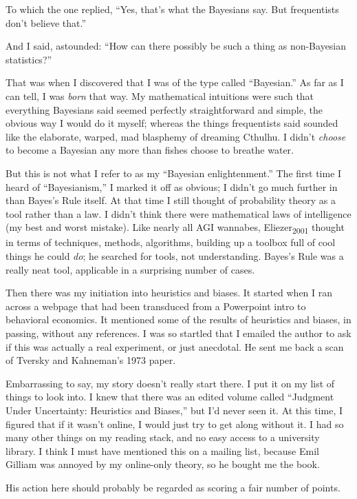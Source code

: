 {
 To which the one replied, ``Yes,
that's what the Bayesians say. But frequentists
don't believe that.''}

{
 And I said, astounded: ``How can there possibly
be such a thing as non-Bayesian statistics?''}

{
 That was when I discovered that I was of the type called
``Bayesian.'' As far as I can tell,
I was \textit{born} that way. My mathematical intuitions were such that
everything Bayesians said seemed perfectly straightforward and simple,
the obvious way I would do it myself; whereas the things frequentists
said sounded like the elaborate, warped, mad blasphemy of dreaming
Cthulhu. I didn't \textit{choose} to become a Bayesian
any more than fishes choose to breathe water.}

{
 But this is not what I refer to as my ``Bayesian
enlightenment.'' The first time I heard of
``Bayesianism,'' I marked it off as
obvious; I didn't go much further in than
Bayes's Rule itself. At that time I still thought of
probability theory as a tool rather than a law. I
didn't think there were mathematical laws of
intelligence (my best and worst mistake). Like nearly all AGI wannabes,
Eliezer\textsubscript{2001} thought in terms of techniques, methods,
algorithms, building up a toolbox full of cool things he could
\textit{do}; he searched for tools, not understanding.
Bayes's Rule was a really neat tool, applicable in a
surprising number of cases.}

{
 Then there was my initiation into heuristics and biases. It
started when I ran across a webpage that had been transduced from a
Powerpoint intro to behavioral economics. It mentioned some of the
results of heuristics and biases, in passing, without any references. I
was so startled that I emailed the author to ask if this was actually a
real experiment, or just anecdotal. He sent me back a scan of Tversky
and Kahneman's 1973 paper.}

{
 Embarrassing to say, my story doesn't really start
there. I put it on my list of things to look into. I knew that there
was an edited volume called ``Judgment Under
Uncertainty: Heuristics and Biases,'' but
I'd never seen it. At this time, I figured that if it
wasn't online, I would just try to get along without
it. I had so many other things on my reading stack, and no easy access
to a university library. I think I must have mentioned this on a
mailing list, because Emil Gilliam was annoyed by my online-only
theory, so he bought me the book.}

{
 His action here should probably be regarded as scoring a fair
number of points.}

